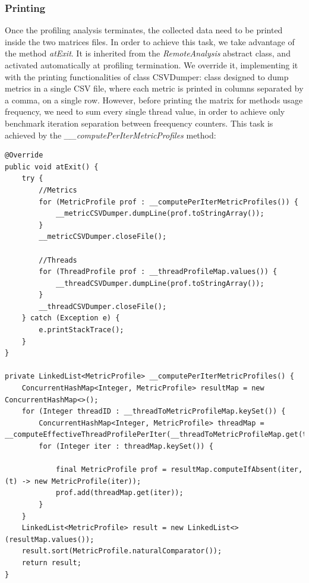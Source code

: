 \documentclass[]{usiinfthesis}
\begin{document}
    \subsubsection{Printing}
    Once the profiling analysis terminates, the collected data need to be printed inside the two matrices files. In order to achieve this task, we take advantage of the method \textit{atExit}. It is inherited from the \textit{RemoteAnalysis} abstract class, and activated automatically at profiling termination. We override it, implementing it with the printing functionalities of class CSVDumper: class designed to dump metrics in a single CSV file, where each metric is printed in columns separated by a comma, on a single row. However, before printing the matrix for methods usage frequency, we need to sum every single thread value, in order to achieve only benchmark iteration separation between freequency counters. This task is achieved by the \textit{\_\_computePerIterMetricProfiles} method:
    \vspace*{0.25cm}
        \begin{verbatim}
@Override
public void atExit() {
    try {
        //Metrics
        for (MetricProfile prof : __computePerIterMetricProfiles()) {
            __metricCSVDumper.dumpLine(prof.toStringArray());
        }
        __metricCSVDumper.closeFile();

        //Threads
        for (ThreadProfile prof : __threadProfileMap.values()) {
            __threadCSVDumper.dumpLine(prof.toStringArray());
        }
        __threadCSVDumper.closeFile();
    } catch (Exception e) {
        e.printStackTrace();
    }
}

private LinkedList<MetricProfile> __computePerIterMetricProfiles() {
    ConcurrentHashMap<Integer, MetricProfile> resultMap = new ConcurrentHashMap<>();
    for (Integer threadID : __threadToMetricProfileMap.keySet()) {
        ConcurrentHashMap<Integer, MetricProfile> threadMap = __computeEffectiveThreadProfilePerIter(__threadToMetricProfileMap.get(threadID));
        for (Integer iter : threadMap.keySet()) {

            final MetricProfile prof = resultMap.computeIfAbsent(iter, (t) -> new MetricProfile(iter));
            prof.add(threadMap.get(iter));
        }
    }
    LinkedList<MetricProfile> result = new LinkedList<>(resultMap.values());
    result.sort(MetricProfile.naturalComparator());
    return result;
}
    \end{verbatim}
    
\end{document}
